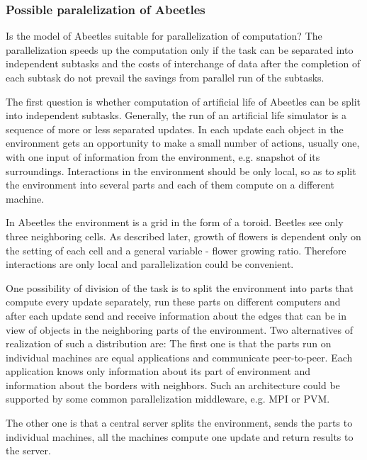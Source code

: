 \documentclass[a4paper,12pt]{report}
\begin{document}
\subsubsection{Possible paralelization of Abeetles}

Is the model of Abeetles suitable for parallelization of computation? The parallelization speeds up the computation only if the task can be separated into independent subtasks and the costs of interchange of data after the completion of each subtask do not prevail the savings from parallel run of the subtasks.

The first question is whether computation of artificial life of Abeetles can be split into independent subtasks. Generally, the run of an artificial life simulator is a sequence of more or less separated updates. In each update each  object in the environment gets an opportunity to make a small number of actions, usually one, with one input of information from the environment, e.g. snapshot of its surroundings. Interactions in the environment should be only local, so as to split the environment into several parts and each of them compute on a different machine. 

In Abeetles the environment is a grid in the form of a toroid. Beetles see only three neighboring cells. As described later, growth of flowers is dependent only on the setting of each cell and a general variable - flower growing ratio. Therefore interactions are only local and parallelization could be convenient. 

One possibility of division of the task is to split the environment into parts that compute every update separately, run these parts on different computers and after each update send and receive information about the edges that can be in view of objects in the neighboring parts of the environment. Two alternatives of realization of such a distribution are: The first one is that the parts run on individual machines are equal applications and communicate peer-to-peer. Each application knows only information about its part of environment and information about the borders with neighbors. Such an architecture could be supported by some common parallelization middleware, e.g. MPI or PVM.


The other one is that a central server splits the environment, sends the parts to individual machines, all the machines compute one update and return results to the server.
\end{document}
